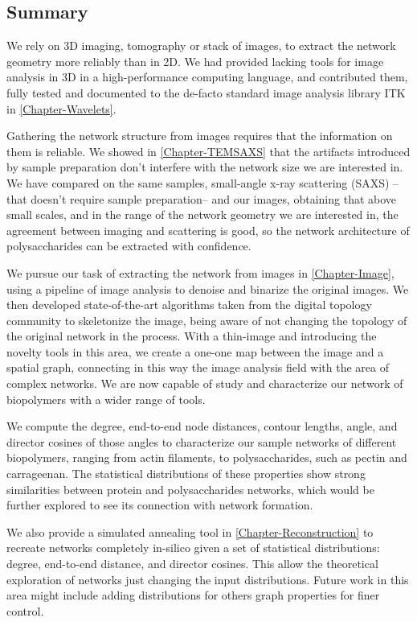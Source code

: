 \subsection{Summary}%
\label{sub:summary}


We rely on 3D imaging, tomography or stack of images, to extract the network geometry more reliably than in 2D. We had provided lacking tools for image analysis in 3D in a high-performance computing language, and contributed them, fully tested and documented to the de-facto standard image analysis library ITK in \autoref{Chapter-Wavelets}.

Gathering the network structure from images requires that the information on them is reliable. We showed in \autoref{Chapter-TEMSAXS} that the artifacts introduced by sample preparation don't interfere with the network size we are interested in. We have compared on the same samples, small-angle x-ray scattering (SAXS) --that doesn't require sample preparation-- and our images, obtaining that above small scales, and in the range of the network geometry we are interested in, the agreement between imaging and scattering is good, so the network architecture of polysaccharides can be extracted with confidence.

We pursue our task of extracting the network from images in \autoref{Chapter-Image}, using a pipeline of image analysis to denoise and binarize the original images. We then developed state-of-the-art algorithms taken from the digital topology community to skeletonize the image, being aware of not changing the topology of the original network in the process. With a thin-image and introducing the novelty tools in this area, we create a one-one map between the image and a spatial graph, connecting in this way the image analysis field with the area of complex networks. We are now capable of study and characterize our network of biopolymers with a wider range of tools.

We compute the degree, end-to-end node distances, contour lengths, angle, and director cosines of those angles to characterize our sample networks of different biopolymers, ranging from actin filaments, to polysaccharides, such as pectin and carrageenan. The statistical distributions of these properties show strong similarities between protein and polysaccharides networks, which would be further explored to see its connection with network formation.

We also provide a simulated annealing tool in \autoref{Chapter-Reconstruction} to recreate networks completely in-silico given a set of statistical distributions: degree, end-to-end distance, and director cosines. This allow the theoretical exploration of networks just changing the input distributions. Future work in this area might include adding distributions for others graph properties for finer control.


